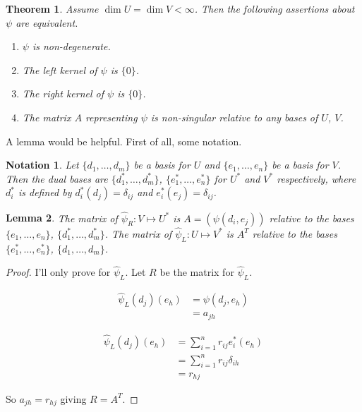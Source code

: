 \documentclass{notes}
\theoremstyle{plain}
\newtheorem{theorem}{Theorem}[chapter]
\newtheorem{lemma}[theorem]{Lemma}
\newtheorem*{notation}{Notation}
\begin{document}
\begin{theorem}\label{2:tref1}
  Assume $\dim U = \dim V < \infty$.  Then the following assertions
  about $\psi$ are equivalent.

\begin{enumerate}
\item $\psi$ is non-degenerate.
\item The left kernel of $\psi$ is $\{0\}$.
\item The right kernel of $\psi$ is $\{0\}$.
\item The matrix $A$ representing $\psi$ is non-singular relative to
  any bases of $U$, $V$.
\end{enumerate}

\end{theorem}

A lemma would be helpful.  First of all, some notation.

\begin{notation}
  Let $\{d_1, \dots ,d_m\}$ be a basis for $U$ and $\{e_1, \dots ,
  e_n\}$ be a basis for $V$.  Then the dual bases are $\{d^{*}_1,
  \dots ,d^{*}_m\}$, $\{e^{*}_1, \dots , e^{*}_n\}$ for $U^*$ and
  $V^*$ respectively, where $d^{*}_i$ is defined by
  $d^{*}_i(d_j)=\delta_{ij}$ and $e^{*}_i(e_j)=\delta_{ij}$.
\end{notation}

\begin{lemma} \label{2:lref}
  The matrix of $\widehat{\psi}_{R} : V \mapsto U^*$ is $A =
  \left(\psi(d_i,e_j)\right)$ relative to the bases $\{e_1, \dots , e_n\}$,
  $\{d^{*}_1, \dots ,d^{*}_m\}$.  The matrix of $\widehat{\psi}_{L} :
  U \mapsto V^*$ is $A^T$ relative to the bases $\{e^*_1, \dots , e^*_n\}$,
  $\{d_1, \dots ,d_m\}$.
\end{lemma}

\begin{proof}
  I'll only prove for $\widehat{\psi}_{L}$.  Let $R$ be the matrix for
  $\widehat{\psi}_{L}$.

\begin{align*}
  \widehat{\psi}_{L}(d_j)(e_h) &= \psi(d_j,e_h) \\
  &= a_{jh}
\end{align*}

\begin{align*}
  \widehat{\psi}_{L}(d_j)(e_h) &= \sum^{n}_{i=1}r_{ij}e^{*}_i(e_h) \\
  &= \sum^{n}_{i=1}r_{ij}\delta_{ih} \\
  &= r_{hj}
\end{align*}

So $a_{jh}=r_{hj}$ giving $R=A^T$.
\end{proof}
\end{document}
